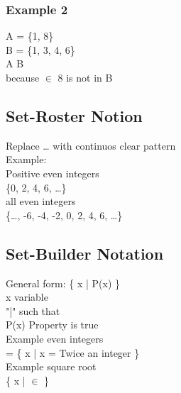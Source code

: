 \documentclass[11pt]{article}
\begin{document}
\subsubsection{Example 2}
\label{sec:orga5603c4}
A = \{1, 8\}\\
B = \{1, 3, 4, 6\}\\
A \nsubseteq B\\
because \(\in\) 8 is not in B\\

\subsection{Set-Roster Notion}
\label{sec:orgbd47beb}
Replace \ldots{} with continuos clear pattern\\
Example:\\
Positive even integers\\
\{0, 2, 4, 6, \ldots{}\}\\
all even integers\\
\{\ldots{}, -6, -4, -2, 0, 2, 4, 6, \ldots{}\}\\

\subsection{Set-Builder Notation}
\label{sec:orgbc0563b}
General form: \{ x | P(x) \}\\
x variable\\
"|" such that\\
P(x) Property is true\\
Example even integers\\
= \{ x | x = Twice an integer \}\\
Example square root\\
\{ x |  \(\in\)  \}\\
\end{document}
